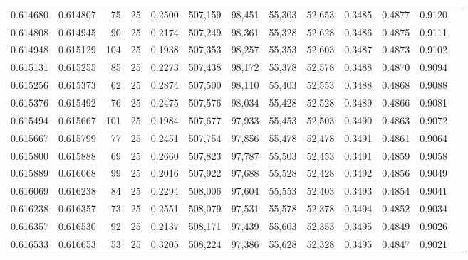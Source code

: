 \begin{tabular}{rrrrrrrrrrrrr}
0.614680 & 0.614807 &    75 &  25 &                                     0.2500 & 507,159 &  98,451 &  55,303 &  52,653 & 0.3485 & 0.4877 & 0.9120 \\
0.614808 & 0.614945 &    90 &  25 &                                     0.2174 & 507,249 &  98,361 &  55,328 &  52,628 & 0.3486 & 0.4875 & 0.9111 \\
0.614948 & 0.615129 &   104 &  25 &                                     0.1938 & 507,353 &  98,257 &  55,353 &  52,603 & 0.3487 & 0.4873 & 0.9102 \\
0.615131 & 0.615255 &    85 &  25 &                                     0.2273 & 507,438 &  98,172 &  55,378 &  52,578 & 0.3488 & 0.4870 & 0.9094 \\
0.615256 & 0.615373 &    62 &  25 &                                     0.2874 & 507,500 &  98,110 &  55,403 &  52,553 & 0.3488 & 0.4868 & 0.9088 \\
0.615376 & 0.615492 &    76 &  25 &                                     0.2475 & 507,576 &  98,034 &  55,428 &  52,528 & 0.3489 & 0.4866 & 0.9081 \\
0.615494 & 0.615667 &   101 &  25 &                                     0.1984 & 507,677 &  97,933 &  55,453 &  52,503 & 0.3490 & 0.4863 & 0.9072 \\
0.615667 & 0.615799 &    77 &  25 &                                     0.2451 & 507,754 &  97,856 &  55,478 &  52,478 & 0.3491 & 0.4861 & 0.9064 \\
0.615800 & 0.615888 &    69 &  25 &                                     0.2660 & 507,823 &  97,787 &  55,503 &  52,453 & 0.3491 & 0.4859 & 0.9058 \\
0.615889 & 0.616068 &    99 &  25 &                                     0.2016 & 507,922 &  97,688 &  55,528 &  52,428 & 0.3492 & 0.4856 & 0.9049 \\
0.616069 & 0.616238 &    84 &  25 &                                     0.2294 & 508,006 &  97,604 &  55,553 &  52,403 & 0.3493 & 0.4854 & 0.9041 \\
0.616238 & 0.616357 &    73 &  25 &                                     0.2551 & 508,079 &  97,531 &  55,578 &  52,378 & 0.3494 & 0.4852 & 0.9034 \\
0.616357 & 0.616530 &    92 &  25 &                                     0.2137 & 508,171 &  97,439 &  55,603 &  52,353 & 0.3495 & 0.4849 & 0.9026 \\
0.616533 & 0.616653 &    53 &  25 &                                     0.3205 & 508,224 &  97,386 &  55,628 &  52,328 & 0.3495 & 0.4847 & 0.9021 \\

\end{tabular}
